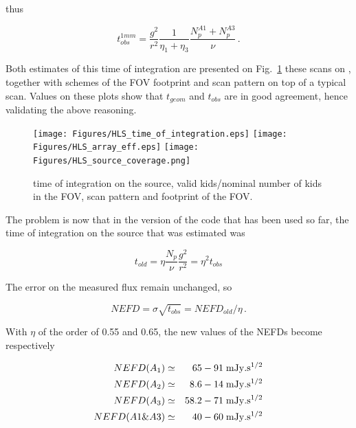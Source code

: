 thus

\begin{equation}
t_{obs}^{1mm} =
\frac{g^2}{r^2}\frac{1}{\eta_1+\eta_3}\frac{N_p^{A1}+N_p^{A3}}{\nu}\,.
\label{eq:t_obs_1mm}
\end{equation}

Both estimates of this time of integration are presented on
Fig.~\ref{fig:time_of_integration} these scans on \hls, together with schemes of
the FOV footprint and scan pattern on top of a typical scan. Values on these
plots show that $t_{geom}$ and $t_{obs}$ are in good agreement, hence validating
the above reasoning.\\

\begin{figure}[htpb]
\begin{center}
\texttt{[image: Figures/HLS\_time\_of\_integration.eps]}
\texttt{[image: Figures/HLS\_array\_eff.eps]}
\texttt{[image: Figures/HLS\_source\_coverage.png]}
\caption{time of integration on the source, valid kids/nominal number of kids in
the FOV, scan pattern and footprint of the FOV.}
\label{fig:time_of_integration}
\end{center}
\end{figure}

The problem is now that in the version of the code that has been used so far,
the time of integration on the source that was estimated was

\begin{equation}
t_{old} = \eta \frac{N_p}{\nu}\frac{g^2}{r^2} = \eta^2 t_{obs}
\label{eq:t_old}
\end{equation}

The error on the measured flux remain unchanged, so

\begin{equation}
NEFD = \sigma \sqrt{t_{obs}} = NEFD_{old}/\eta\,.
\end{equation}

With $\eta$ of the order of 0.55 and 0.65, the new values of the NEFDs become
respectively

\begin{eqnarray}
NEFD(A_1)    &\simeq& 65 - 91   \;{\rm mJy.s^{1/2}}\nonumber \\
NEFD(A_2)    &\simeq& 8.6 - 14  \;{\rm mJy.s^{1/2}}\nonumber \\
NEFD(A_3)    &\simeq& 58.2 - 71 \;{\rm mJy.s^{1/2}}\nonumber \\
NEFD(A1\&A3) &\simeq& 40 - 60   \;{\rm mJy.s^{1/2}}\nonumber
\end{eqnarray}

